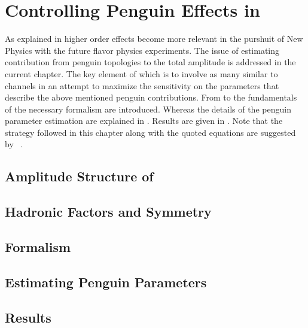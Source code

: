 
\chapter{Controlling Penguin Effects in \phis}
\label{Penguins}

As explained in  higher order effects become more relevant in the purshuit
of New Physics with the future flavor physics experiments. The issue of estimating contribution from penguin topologies
to the total \BsJpsiPhi amplitude is addressed in the current chapter. The key element of which
is to involve as many similar to \BsJpsiPhi channels in an attempt to maximize the sensitivity on
the parameters that describe the above mentioned penguin contributions. From 
to  the fundamentals of the necessary formalism are introduced.
Whereas the details of the penguin parameter estimation are explained in .
Results are given in . Note that the strategy followed in this chapter
along with the quoted equations are suggested by ~\cite{Fleischer:1999zi,Faller:2008gt,DeBruyn:2014oga}.

\section{Amplitude Structure of \BsJpsiPhi}
\label{jpsiphi_amp_struct}


\section{Hadronic Factors and \grpsuthree Symmetry}
\label{had_pars_suthree}


\section{Formalism}
\label{penguin_formalism}


\section{Estimating Penguin Parameters}
\label{penguin_more_chanells}


\section{Results}
\label{penguin_results}

